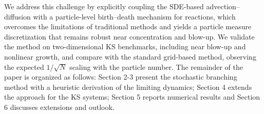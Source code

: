 \documentclass[preprint,12pt]{elsarticle}
\theoremstyle{definition}
\theoremstyle{remark}
\begin{document}
We address this challenge by explicitly coupling the SDE-based advection--diffusion with a particle-level birth--death mechanism for reactions, which overcomes the limitations of traditional methods and yields a particle measure discretization that remains robust near concentration and blow-up. We validate the method on two-dimensional KS benchmarks, including near blow-up and nonlinear growth, and compare with the standard grid-based method, observing the expected $1/\sqrt{N}$ scaling with the particle number.
%
The remainder of the paper is organized as follows: Section 2-3 present the stochastic branching method with a heuristic derivation of the limiting dynamics; Section 4 extends the approach for the KS systems; Section 5 reports numerical results and Section 6 discusses extensions and outlook.



\end{document}
